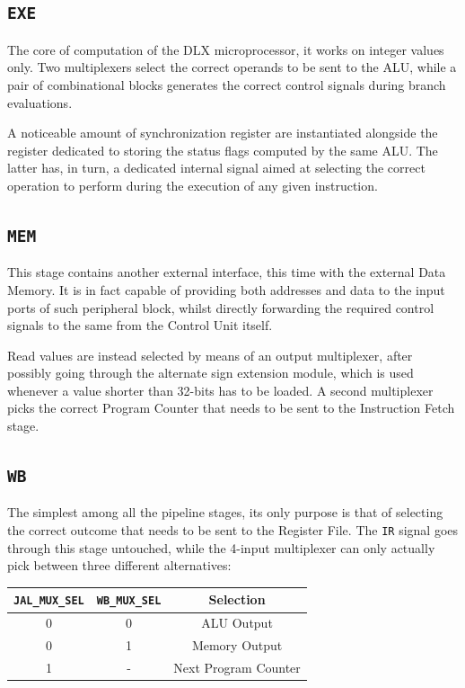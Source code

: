 \subsection{\texttt{EXE}}
The core of computation of the DLX microprocessor, it works on integer values only. Two multiplexers select the correct operands to be sent to the ALU, while a pair of combinational blocks generates the correct control signals during branch evaluations.

A noticeable amount of synchronization register are instantiated alongside the register dedicated to storing the status flags computed by the same ALU. The latter has, in turn, a dedicated internal signal aimed at selecting the correct operation to perform during the execution of any given instruction.

\subsection{\texttt{MEM}}
This stage contains another external interface, this time with the external Data Memory. It is in fact capable of providing both addresses and data to the input ports of such peripheral block, whilst directly forwarding the required control signals to the same from the Control Unit itself.

Read values are instead selected by means of an output multiplexer, after possibly going through the alternate sign extension module, which is used whenever a value shorter than 32-bits has to be loaded. A second multiplexer picks the correct Program Counter that needs to be sent to the Instruction Fetch stage.

\subsection{\texttt{WB}}
The simplest among all the pipeline stages, its only purpose is that of selecting the correct outcome that needs to be sent to the Register File. The \texttt{IR} signal goes through this stage untouched, while the 4-input multiplexer can only actually pick between three different alternatives:
\begin{table}[!ht]
\centering
\begin{tabular}{cc|c}
\toprule
\texttt{JAL\_MUX\_SEL} & \texttt{WB\_MUX\_SEL} & Selection\\
\midrule
0 & 0 & ALU Output\\
0 & 1 & Memory Output\\
1 & - & Next Program Counter\\
\bottomrule
\end{tabular}
\end{table}

